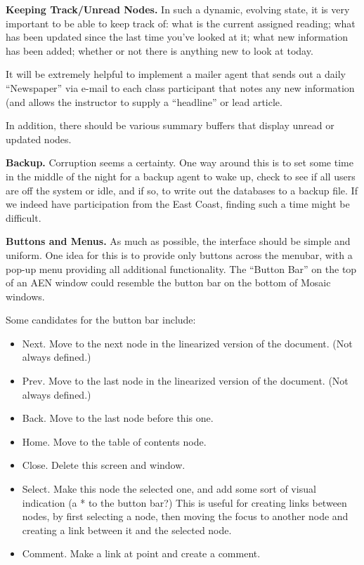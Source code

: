\begin{itemizenoindent}
\item {\bf Keeping Track/Unread Nodes.} In such a dynamic, evolving state,
  it is very important to be able to keep track of: what is the current
  assigned reading; what has been updated since the last time you've looked
  at it; what new information has been added; whether or not there is
  anything new to look at today.  

  It will be extremely helpful to implement a mailer agent that sends out
  a daily ``Newspaper''  via e-mail to each class participant that notes
  any new information (and allows the instructor to supply a ``headline''
  or lead article. 

  In addition, there should be various summary buffers that display unread
  or updated nodes. 
  
\item {\bf Backup.} Corruption seems a certainty.  One way around this is
  to set some time in the middle of the night for a backup agent to wake up,
  check to see if all users are off the system or idle, and if so, to
  write out the databases to a backup file.   If we indeed have
  participation from the East Coast, finding such a time might be
  difficult. 

  
\item {\bf Buttons and Menus.} As much as possible, the interface should be
  simple and uniform.  One idea for this is to provide only buttons across
  the menubar, with a pop-up menu providing all additional functionality.
  The ``Button Bar'' on the top of an AEN window could resemble the button bar 
  on the bottom of Mosaic windows.  

  Some candidates for the button bar include:

  \begin{itemize}
    
  \item Next.  Move to the next node in the linearized version of the
    document.  (Not always defined.)
  \item Prev.  Move to the last node in the linearized version of the
    document.  (Not always defined.)
  \item Back.  Move to the last node before this one. 
  \item Home.  Move to the table of contents node. 
  \item Close. Delete this screen and window.
  \item Select.  Make this node the selected one, and add some sort of
    visual indication (a * to the button bar?)  This is useful for creating
    links between nodes, by first selecting a node, then moving the focus to
    another node and creating a link between it and the selected node.
  \item Comment.  Make a link at point and create a comment.


\end{itemize}
\end{itemizenoindent}
